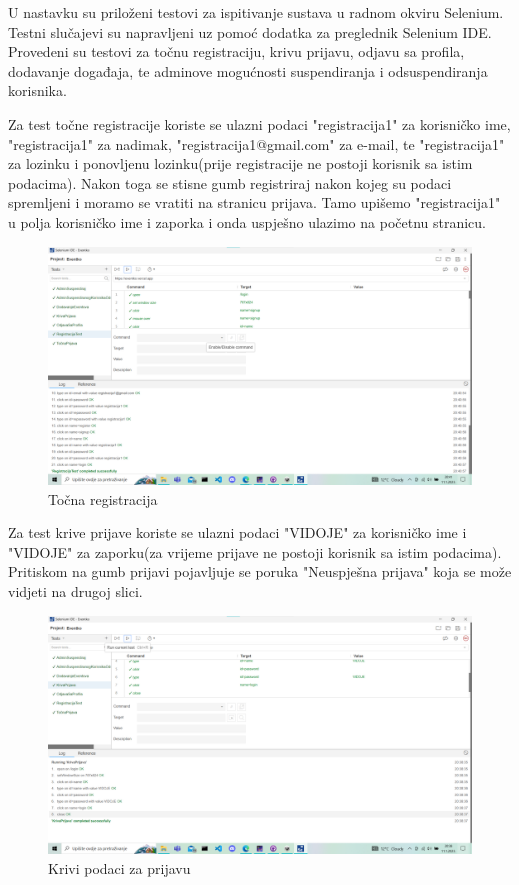 			 
			 
		 	
		 	\indent U nastavku su priloženi testovi za ispitivanje sustava u radnom okviru Selenium. Testni slučajevi su napravljeni uz pomoć dodatka za preglednik Selenium IDE. Provedeni su testovi za točnu registraciju, krivu prijavu, odjavu sa profila, dodavanje događaja, te adminove mogućnosti suspendiranja i odsuspendiranja korisnika.
		 	
		 	\indent Za test točne registracije koriste se ulazni podaci "registracija1" za korisničko ime, "registracija1" za nadimak, "registracija1@gmail.com" za e-mail, te "registracija1" za lozinku i ponovljenu lozinku(prije registracije ne postoji korisnik sa istim podacima). Nakon toga se stisne gumb registriraj nakon kojeg su podaci spremljeni i moramo se vratiti na stranicu prijava. Tamo upišemo "registracija1" u polja korisničko ime i zaporka i onda uspješno ulazimo na početnu stranicu.
		 	\begin{figure}[H]
		 		\includegraphics[width=\textwidth]{Slike/RegistracijaTest.png}
		 		\caption{Točna registracija}
		 	\end{figure}
	 	
	 		\indent Za test krive prijave koriste se ulazni podaci "VIDOJE" za korisničko ime i "VIDOJE" za zaporku(za vrijeme prijave ne postoji korisnik sa istim podacima). Pritiskom na gumb prijavi pojavljuje se poruka "Neuspješna prijava" koja se može vidjeti na drugoj slici.
	 		
	 		\begin{figure}[H]
	 			\includegraphics[width=\textwidth]{Slike/KrivaPrijava.png}
	 			\caption{Krivi podaci za prijavu}
	 		\end{figure}
 		
